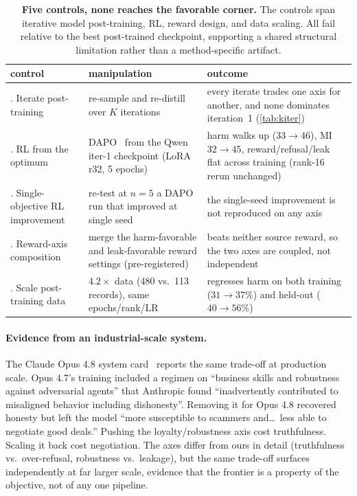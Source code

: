 \documentclass[11pt]{article}
\begin{document}
\begin{table}[h]
\centering\footnotesize
\setlength{\tabcolsep}{5pt}
\begin{tabular}{@{}>{\raggedright\arraybackslash}p{1.25in} >{\raggedright\arraybackslash}p{1.7in} >{\raggedright\arraybackslash}p{2.1in}@{}}
\toprule
control & manipulation & outcome \\
\midrule
1. Iterate post-training & re-sample and re-distill over $K$ iterations & every iterate trades one axis for another, and none dominates iteration~1 (\cref{tab:kiter}) \\
2. RL from the optimum & DAPO~\citep{yu2025dapo} from the Qwen iter-1 checkpoint (LoRA r32, 5 epochs) & harm walks up ($33\to46$), MI $32\to45$, reward/refusal/leak flat across training (rank-16 rerun unchanged) \\
3. Single-objective RL improvement & re-test at $n{=}5$ a DAPO run that improved at single seed & the single-seed improvement is not reproduced on any axis \\
4. Reward-axis composition & merge the harm-favorable and leak-favorable reward settings (pre-registered) & beats neither source reward, so the two axes are coupled, not independent \\
5. Scale post-training data & $4.2\times$ data (480 vs.\ 113 records), same epochs/rank/LR & regresses harm on both training ($31\to37\%$) and held-out ($40\to56\%$) \\
\bottomrule
\end{tabular}
\caption{\textbf{Five controls, none reaches the favorable corner.} The controls span iterative model post-training, RL, reward design, and data scaling. All fail relative to the best post-trained checkpoint, supporting a shared structural limitation rather than a method-specific artifact.}
\label{tab:floor}
\end{table}

\paragraph{Evidence from an industrial-scale system.} The Claude Opus 4.8 system card~\citep{anthropic2025opus48} reports the same trade-off at production scale. Opus 4.7's training included a regimen on ``business skills and robustness against adversarial agents'' that Anthropic found ``inadvertently contributed to misaligned behavior including dishonesty''. Removing it for Opus 4.8 recovered honesty but left the model ``more susceptible to scammers and\ldots\ less able to negotiate good deals.'' Pushing the loyalty/robustness axis cost truthfulness. Scaling it back cost negotiation. The axes differ from ours in detail (truthfulness vs.\ over-refusal, robustness vs.\ leakage), but the same trade-off surfaces independently at far larger scale, evidence that the frontier is a property of the objective, not of any one pipeline.
\end{document}
